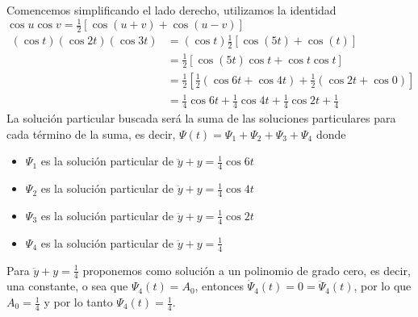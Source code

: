 \documentclass{article}
\begin{document}
\begin{enumerate}
{            Comencemos simplificando el lado derecho, utilizamos la identidad
            $\cos{u}\cos{v}=\frac{1}{2}\left[\cos{(u+v)}+\cos{(u-v)}\right]$
            \begin{align*}
                (\cos{t})(\cos{2t})(\cos{3t})
                &= (\cos{t})\frac{1}{2}\left[
                    \cos{(5t)}+\cos{(t)}
                \right]\\
                &= \frac{1}{2}\left[
                    \cos{(5t)}\cos{t}+\cos{t}\cos{t}
                \right] \\
                &= \frac{1}{2}\left[
                    \frac{1}{2}(\cos{6t}+\cos{4t})
                    +\frac{1}{2}(\cos{2t}+\cos{0})
                \right] \\
                &= \frac{1}{4}\cos{6t} + \frac{1}{4}\cos{4t} + \frac{1}{4}\cos{2t} + \frac{1}{4}
            \end{align*}
            La solución particular buscada será la suma de las soluciones particulares para cada
            término de la suma, es decir, $\Psi(t)=\Psi_1+\Psi_2+\Psi_3+\Psi_4$ donde
            \begin{itemize}
                \item $\Psi_1$ es la solución particular de $\ddot y+y=\frac{1}{4}\cos{6t}$
                \item $\Psi_2$ es la solución particular de $\ddot y+y=\frac{1}{4}\cos{4t}$
                \item $\Psi_3$ es la solución particular de $\ddot y+y=\frac{1}{4}\cos{2t}$
                \item $\Psi_4$ es la solución particular de $\ddot y+y=\frac{1}{4}$
            \end{itemize}
            Para $\ddot y+y=\frac{1}{4}$ proponemos como solución a un polinomio de grado cero, es
            decir, una constante, o sea que $\Psi_4(t)=A_0$, entonces
            $\dot\Psi_4(t)=0=\ddot\Psi_4(t)$, por lo que $A_0=\frac{1}{4}$ y por lo tanto
            $\Psi_4(t)=\frac{1}{4}$.

}
\end{enumerate}
\end{document}
